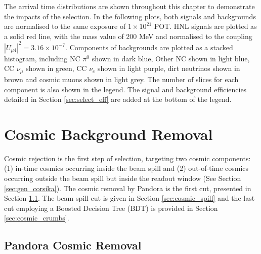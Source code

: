 The arrival time distributions are shown throughout this chapter to demonstrate the impacts of the selection.
In the following plots, both signals and backgrounds are normalised to the same exposure of $1 \times 10^{21}$ POT.
HNL signals are plotted as a solid red line, with the mass value of 200 MeV and normalised to the coupling $|U_{\mu4}|^2 = 3.16 \times 10^{-7}$.
Components of backgrounds are plotted as a stacked histogram, including NC $\pi^0$ shown in dark blue, Other NC shown in light blue, CC $\nu_{\mu}$ shown in green, CC $\nu_e$ shown in light purple, dirt neutrinos shown in brown and cosmic muons shown in light grey.
The number of slices for each component is also shown in the legend.
The signal and background efficiencies detailed in Section \ref{sec:select_eff} are added at the bottom of the legend.


\section{Cosmic Background Removal}
\label{sec:cosmic_rej}

Cosmic rejection is the first step of selection, targeting two cosmic components: (1) in-time cosmics occurring inside the beam spill and (2) out-of-time cosmics occurring outside the beam spill but inside the readout window (See Section \ref{sec:gen_corsika}).  
The cosmic removal by Pandora is the first cut, presented in Section \ref{sec:cosmic_pandora}.
The beam spill cut is given in Section \ref{sec:cosmic_spill} and the last cut employing a Boosted Decision Tree (BDT) is provided in Section \ref{sec:cosmic_crumbs}.

\subsection{Pandora Cosmic Removal}
\label{sec:cosmic_pandora}

